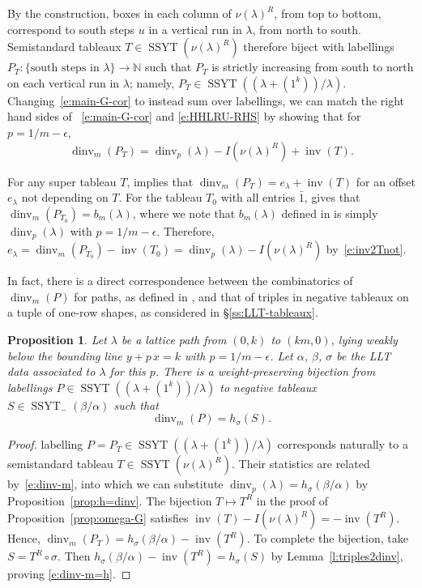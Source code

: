 \documentclass[12pt]{amsart}
\newtheorem{prop}[thm]{Proposition}
\theoremstyle{definition}
\theoremstyle{remark}
\newcommand{\NN}{{\mathbb N}}
\DeclareMathOperator{\dinv}{dinv}
\DeclareMathOperator{\inv}{inv}
\DeclareMathOperator{\SSYT}{SSYT}
\begin{document}
By the construction, boxes in each column of $\nu (\lambda )^{R}$,
from top to bottom, correspond to south steps $u$ in a vertical run in
$\lambda $, from north to south.  Semistandard tableaux $T\in \SSYT
(\nu (\lambda )^{R})$ therefore biject with labellings $P_T\colon
\{\text{south steps in $\lambda $} \}\rightarrow \NN $ such that $P_T$
is strictly increasing from south to north on each vertical run in
$\lambda $; namely, $P_T\in\SSYT((\lambda+(1^k))/\lambda)$.
Changing~\eqref{e:main-G-cor} to instead sum over labellings, we can
match the right hand sides of ~\eqref{e:main-G-cor} and
\eqref{e:HHLRU-RHS} by showing that for $p=1/m-\epsilon$,
\begin{equation}\label{e:dinv-m}
\dinv _{m}(P_T) = \dinv _{p}(\lambda ) - I(\nu (\lambda )^{R}) +\inv(T).
\end{equation}

For any super tableau $T$, \cite[Corollary 6.4.2]{HaHaLoReUl05}
implies that $\dinv _{m}(P_T) = e_{\lambda }+\inv(T)$ for an offset
$e_{\lambda }$ not depending on $T$.  For the tableau $T_0$ with all
entries $\bar 1$, \cite[Lemma 6.3.3]{HaHaLoReUl05} gives that
$\dinv_m(P_{T_0})= b_m(\lambda)$, where we note that $b_m(\lambda)$
defined in \cite[(100)]{HaHaLoReUl05} is simply $\dinv_p(\lambda)$
with $p=1/m-\epsilon$.  Therefore, $e_\lambda = \dinv
_{m}(P_{T_0})-\inv(T_0) = \dinv_p(\lambda) - I(\nu(\lambda)^R)$
by~\eqref{e:inv2Tnot}.

In fact, there is a direct correspondence between
the combinatorics of $\dinv_{m}(P)$ for paths, as defined in 
\cite{HaHaLoReUl05}, and that of triples in negative tableaux on a tuple 
of one-row shapes, as considered in \S \ref{ss:LLT-tableaux}.

\begin{prop}\label{prop:dinv-m=h}
Let $\lambda$ be a lattice path from $(0,k)$ to $(km,0)$, lying 
weakly below the bounding line $y + p\, x = k$ with $p = 1/m-\epsilon$.
Let $\alpha$, $\beta$, $\sigma$ be the LLT data associated to
$\lambda$ for this $p$.
There is a weight-preserving bijection  from labellings 
$P\in\SSYT((\lambda+(1^k))/\lambda)$ to negative
tableaux $ S\in \SSYT_{-} (\beta/\alpha)$ such that
\begin{equation}\label{e:dinv-m=h}
\dinv_m(P)=h_\sigma(S).
\end{equation}
\end{prop}

\begin{proof}
labelling $P=P_T\in \SSYT((\lambda+(1^k))/\lambda)$ corresponds naturally
to a semistandard tableau $T\in\SSYT(\nu(\lambda)^R)$. Their statistics
are related by~\eqref{e:dinv-m}, into which we can
substitute \(\dinv_p(\lambda) = h_\sigma(\beta/\alpha)\) by
Proposition~\ref{prop:h=dinv}. 
The bijection $T\mapsto T^{R}$ in the proof of
Proposition~\ref{prop:omega-G} satisfies $\inv(T)-I(\nu(\lambda)^R) =
-\inv(T^R)$.
Hence, $\dinv _{m}(P_T) = h_\sigma(\beta/\alpha)-\inv(T^R)$. 
To complete the bijection, take
$S=T^R\circ\sigma$.
Then \(h_\sigma(\beta/\alpha)-\inv(T^R) = h_\sigma(S)\) by
Lemma~\ref{l:triples2dinv}, proving \eqref{e:dinv-m=h}.
\end{proof}
\end{document}
